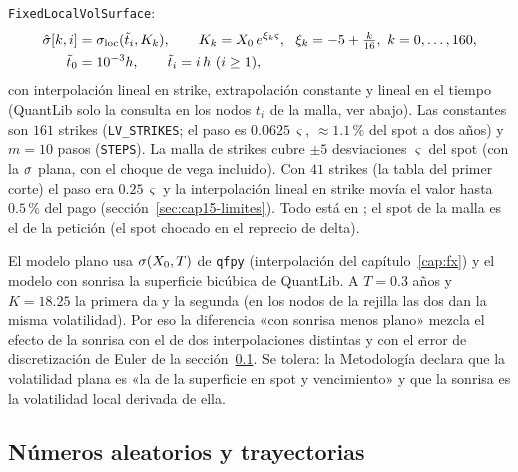 \texttt{FixedLocalVolSurface}:
\begin{equation}\label{eq:cap15-tabla}
  \begin{aligned}
  \hat\sigma[k,i]&=\sigma_{\mathrm{loc}}(\tilde t_i,K_k),\qquad K_k=\Spot\,e^{\xi_k\varsigma},\ \ \xi_k=-5+\tfrac{k}{16},\ k=0,\dots,160,\\
  \tilde t_0&=10^{-3}h,\qquad \tilde t_i=i\,h\ (i\ge1),
  \end{aligned}
\end{equation}
con interpolación lineal en strike, extrapolación constante y lineal en el tiempo (QuantLib solo la consulta en los nodos $t_i$ de la
malla, ver abajo). Las constantes son $161$ strikes (\texttt{LV\_STRIKES}; el paso es $0.0625\,\varsigma$, $\approx1.1\,\%$ del spot a dos años) y $m=10$ pasos
(\texttt{STEPS}). La malla de strikes cubre $\pm5$ desviaciones $\varsigma$ del spot (con la $\sigma$ plana, con el choque de vega incluido). Con $41$ strikes (la tabla del
primer corte) el paso era $0.25\,\varsigma$ y la interpolación lineal en strike movía el valor hasta $0.5\,\%$ del pago (sección~\ref{sec:cap15-limites}). Todo está en
; el spot de la malla es el de la petición (el spot chocado en el reprecio de delta).

\begin{diferencia}
  El modelo plano usa $\sigma(X_0,T)$ de \texttt{qfpy} (interpolación del capítulo~\ref{cap:fx}) y el modelo con sonrisa la superficie
  bicúbica de QuantLib. A $T=0.3$ años y $K=18.25$ la primera da  y la segunda
   (en los nodos de la rejilla las dos dan la misma volatilidad). Por eso la diferencia
  «con sonrisa menos plano» mezcla el efecto de la sonrisa con el de dos interpolaciones distintas y con el error de discretización
  de Euler de la sección~\ref{sec:cap15-trayectorias}. Se tolera: la Metodología declara que la volatilidad plana es «la de la superficie
  en spot y vencimiento» y que la sonrisa es la volatilidad local derivada de ella.
\end{diferencia}

\subsection{Números aleatorios y trayectorias}\label{sec:cap15-trayectorias}

